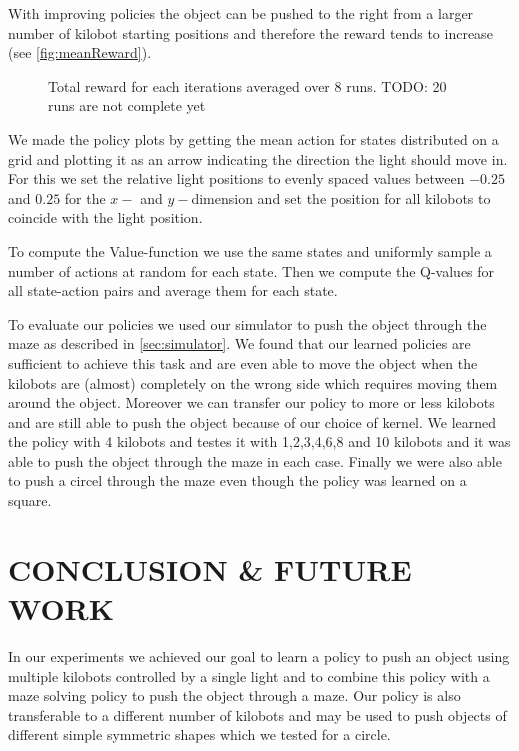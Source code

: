 \documentclass[twoside]{article}
\begin{document}
With improving policies the object can be pushed to the right from a larger
number of kilobot starting positions and therefore the reward tends to increase
(see \autoref{fig:meanReward}).

\begin{figure}[!htb]
    \centering
    \resizebox{\linewidth}{!}{}
    \caption{Total reward for each iterations averaged over 8 runs.
             TODO: 20 runs are not complete yet}
    \label{fig:meanReward}
\end{figure}

We made the policy plots by getting the mean action for states distributed on a
grid and plotting it as an arrow indicating the direction the light should move
in. For this we set the relative light positions to evenly spaced values between
$-0.25$ and $0.25$ for the $x-$ and $y-$dimension and set the position for all
kilobots to coincide with the light position.

To compute the Value-function we use the same states and uniformly sample a
number of actions at random for each state. Then we compute the Q-values for all
state-action pairs and average them for each state.

To evaluate our policies we used our simulator to push the object through the
maze as described in \ref{sec:simulator}. We found that our learned policies are
sufficient to achieve this task and are even able to move the object when the
kilobots are (almost) completely on the wrong side which requires moving them
around the object. Moreover we can transfer our policy to more or less kilobots
and are still able to push the object because of our choice of kernel. We
learned the policy with 4 kilobots and testes it with 1,2,3,4,6,8 and 10
kilobots and it was able to push the object through the maze in each case.
Finally we were also able to push a circel through the maze even though the
policy was learned on a square.

\section{CONCLUSION \& FUTURE WORK}

In our experiments we achieved our goal to learn a policy to push an object
using multiple kilobots controlled by a single light and to combine this policy
with a maze solving policy to push the object through a maze. Our policy is also
transferable to a different number of kilobots and may be used to push objects of
different simple symmetric shapes which we tested for a circle.
\end{document}
